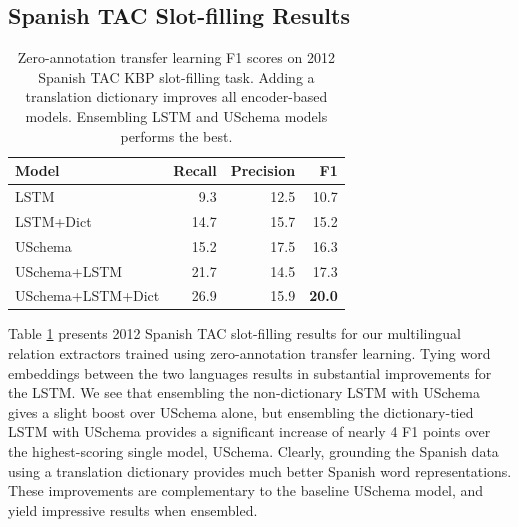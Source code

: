\subsection{Spanish TAC Slot-filling Results \label{sec:qual-anal}}

\begin{table}
\begin{center}
\begin{tabular}{|lrrr|}
\hline
\bf Model & \bf Recall & \bf Precision & \bf F1 \\
\hline\hline
LSTM 		      &  9.3 & 12.5   & 10.7   \\
LSTM+Dict	      &  14.7 & 15.7  & 15.2   \\
USchema           &  15.2 & 17.5  & 16.3  \\
\hline\hline
USchema+LSTM       & 21.7 & 14.5  & 17.3  \\
USchema+LSTM+Dict  & 26.9 & 15.9  & \bf 20.0 \\
\hline
\end{tabular}
\caption{Zero-annotation transfer learning F1 scores on 2012 Spanish TAC KBP slot-filling task. Adding a translation dictionary improves all encoder-based models. Ensembling LSTM and USchema models performs the best. \label{es-tac-table}}
\end{center}
\vspace{-.4cm}
\end{table}


Table \ref{es-tac-table} presents 2012 Spanish TAC slot-filling results for our multilingual relation extractors trained using zero-annotation transfer learning. Tying word embeddings between the two languages results in substantial improvements for the LSTM. We see that ensembling the non-dictionary LSTM with USchema gives a slight boost over USchema alone, but ensembling the dictionary-tied LSTM with USchema provides a significant increase of nearly 4 F1 points over the highest-scoring single model, USchema. Clearly, grounding the Spanish data using a translation dictionary provides much better Spanish word representations. These improvements are complementary to the baseline USchema model, and yield impressive results when ensembled.

